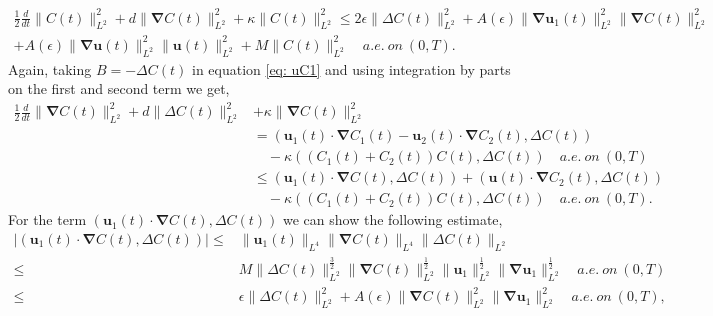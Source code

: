 \documentclass[final,3p,times]{elsarticle}
\theoremstyle{plain}
\theoremstyle{remark}
\theoremstyle{plain}
\theoremstyle{remark}
\begin{document}
\begin{align}
     \frac{1}{2} \frac{d}{dt}\|C\left(t\right)\|^2_{L^2}+d\|\boldsymbol{\nabla} C\left(t\right)\|^2_{L^2}+\kappa
     \| C\left(t\right)\|^2_{L^2}\le 2 \epsilon \|\Delta C\left(t\right)\|^2_{L^2}+A\left(\epsilon\right) \|\boldsymbol{\nabla}\mathbf u_1\left(t\right)\|^2_{L^2} \|\boldsymbol{\nabla} C\left(t\right)\|^2_{L^2} \nonumber\\+ A\left(\epsilon\right) \|\boldsymbol{\nabla}\mathbf u\left(t\right)\|^2_{L^2} \|\mathbf u\left(t\right)\|^2_{L^2} +M \|C\left(t\right)\|^2_{L^2}  \quad a.e.\ on\ \left(0,T\right). \label{eq: uC3}
\end{align}
Again, taking $B=-\Delta C\left(t\right)$ in equation \eqref{eq: uC1} and using integration by parts on the first and second term we get,
\begin{align}
    \frac{ 1}{2} \frac{d}{dt}\|\boldsymbol{\nabla} C\left(t\right)\|^2_{L^2}+d    \| \Delta C\left(t\right)\|^2_{L^2} 
    & + \kappa \|\boldsymbol{\nabla} C\left(t\right)\|^2_{L^2} \nonumber \\ 
    & = \left(\mathbf u_1\left(t\right)\cdot\boldsymbol{\nabla} C_1\left(t\right)-\mathbf u_2\left(t\right)\cdot\boldsymbol{\nabla} C_2\left(t\right),\Delta C\left(t\right)\right) \nonumber \\  
    & \quad - \kappa \left(\left(C_1\left(t\right)+C_2\left(t\right)\right)C\left(t\right),\Delta C\left(t\right)\right) \quad a.e.\ on\ \left(0,T\right)\nonumber \\
    & \le \left(\mathbf u_1\left(t\right)\cdot\boldsymbol{\nabla} C\left(t\right),\Delta C\left(t\right)\right) + \left(\mathbf u\left(t\right) \cdot \boldsymbol{\nabla} C_2\left(t\right) ,\Delta C\left(t\right)\right) \nonumber \\ 
    & \quad - \kappa \left(\left(C_1\left(t\right)+C_2\left(t\right)\right)C\left(t\right),\Delta C\left(t\right)\right) \quad a.e.\ on\ \left(0,T\right) \label{eq: unabC1}.
\end{align}
For the term $\left(\mathbf u_1\left(t\right)\cdot\boldsymbol{\nabla} C\left(t\right),\Delta C\left(t\right)\right)$ we can show the following estimate,
\begin{align}
   | \left( \mathbf u_1\left(t\right)\cdot\boldsymbol{\nabla} C\left(t\right),\Delta C\left(t\right) \right)|\le & \|\mathbf u_1\left(t\right)\|_{L^4}\|\boldsymbol{\nabla} C\left(t\right)\|_{L^4}\|\Delta C\left(t\right)\|_{L^2} \nonumber \\
    \le& M \| \Delta C\left(t\right)\|^\frac{3}{2}_{L^2} \|\boldsymbol{\nabla} C\left(t\right)\|^\frac{1}{2}_{L^2}\|\mathbf u_1\|^\frac{1}{2}_{L^2}\|\boldsymbol{\nabla} \mathbf u_1\|^\frac{1}{2}_{L^2} \quad a.e.\ on\ \left(0,T\right)  \nonumber \\
    \le& \epsilon \| \Delta C\left(t\right)\|^{2}_{L^2} + A\left(\epsilon\right) \|\boldsymbol{\nabla} C\left(t\right)\|^{2}_{L^2} \|\boldsymbol{\nabla} \mathbf u_1\|^{2}_{L^2} \quad a.e.\ on\ \left(0,T\right), \label{eq: u.nab C, delta C}
\end{align}
\end{document}
